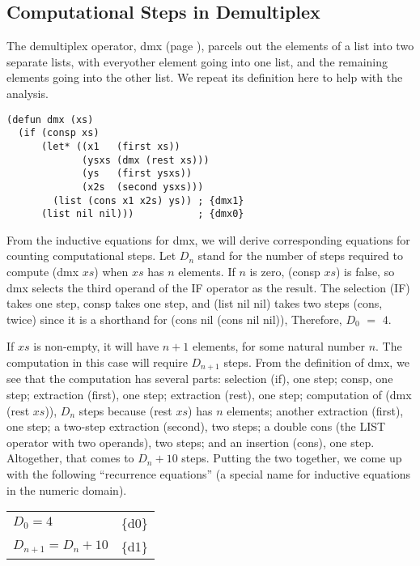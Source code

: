 \subsection{Computational Steps in Demultiplex}
\label{subsec:dmx-steps}

The demultiplex operator, dmx (page \pageref{defun:dmx}), parcels out the elements of a list
into two separate lists, with everyother element going into one list,
and the remaining elements going into the other list.
We repeat its definition here to help with the analysis.

\label{defun:dmx-copy}
\begin{Verbatim}
(defun dmx (xs)
  (if (consp xs)
      (let* ((x1   (first xs))
             (ysxs (dmx (rest xs)))
             (ys   (first ysxs))
             (x2s  (second ysxs)))
        (list (cons x1 x2s) ys)) ; {dmx1}
      (list nil nil)))           ; {dmx0}
\end{Verbatim}

From the inductive equations for dmx,
we will derive corresponding equations for counting computational steps.
Let $D_n$ stand for the number of steps required
to compute (dmx $xs$) when $xs$ has $n$ elements.
If $n$ is zero, (consp $xs$) is false,
so dmx selects the third operand of the IF operator as the result.
The selection (IF) takes one step,
consp takes one step, and (list nil nil) takes two steps (cons, twice)
since it is a shorthand for (cons nil (cons nil nil)),
Therefore, $D_0$ $=$ $4$.

If $xs$ is non-empty, it will have $n+1$ elements,
for some natural number $n$.
The computation in this case will require $D_{n+1}$ steps.
From the definition of dmx, we see that the computation
has several parts:
selection (if), one step;
consp, one step;
extraction (first), one step;
extraction (rest), one step;
computation of (dmx (rest $xs$)), $D_n$ steps because (rest $xs$) has $n$ elements;
another extraction (first), one step;
a two-step extraction (second), two steps;
a double cons (the LIST operator with two operands), two steps; and
an insertion (cons), one step.
Altogether, that comes to $D_n + 10$ steps.
Putting the two together, we come up with the following ``recurrence equations''
(a special name for inductive equations in the numeric domain).
\begin{center}
\begin{tabular}{ll}
  $D_0 = 4$            & \{d0\} \\
  $D_{n+1} = D_n + 10$ & \{d1\} \\
\end{tabular}
\end{center}

